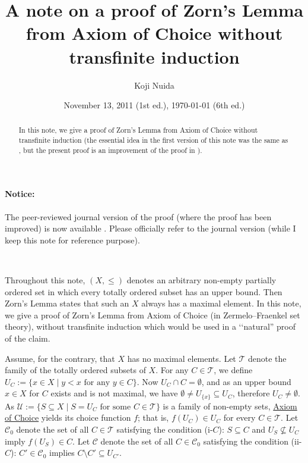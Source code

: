 \documentclass{article}
\title{A note on a proof of Zorn's Lemma from Axiom of Choice without transfinite induction}
\author{Koji Nuida}
\date{November 13, 2011 (1st ed.), \today{} (6th ed.)}
\begin{document}
\maketitle

\begin{abstract}
In this note, we give a proof of Zorn's Lemma from Axiom of Choice without transfinite induction (the essential idea in the first version of this note was the same as \cite[Theorem 4.19]{RubRub85}, but the present proof is an improvement of the proof in \cite{Lewin91}).
\end{abstract}

\paragraph{Notice:}
The peer-reviewed journal version of the proof (where the proof has been improved) is now available \cite{Nuida24}.
Please officially refer to the journal version (while I keep this note for reference purpose).

\ 

Throughout this note, $(X,\leq)$ denotes an arbitrary non-empty partially ordered set in which every totally ordered subset has an upper bound.
Then Zorn's Lemma states that such an $X$ always has a maximal element.
In this note, we give a proof of Zorn's Lemma from Axiom of Choice (in Zermelo--Fraenkel set theory), without transfinite induction which would be used in a \lq\lq natural'' proof of the claim.

Assume, for the contrary, that $X$ has no maximal elements.
Let $\mathcal{T}$ denote the family of the totally ordered subsets of $X$.
For any $C \in \mathcal{T}$, we define $U_C := \{ x \in X \mid y < x \mbox{ for any } y \in C \}$.
Now $U_C \cap C = \emptyset$, and as an upper bound $x \in X$ for $C$ exists and is not maximal, we have $\emptyset \neq U_{\{x\}} \subseteq U_C$, therefore $U_C \neq \emptyset$.
As $\mathcal{U} := \{ S \subseteq X \mid S = U_C \mbox{ for some } C \in \mathcal{T} \}$ is a family of non-empty sets, \underline{Axiom of Choice} yields its choice function $f$; that is, $f(U_C) \in U_C$ for every $C \in \mathcal{T}$.
Let $\mathcal{C}_0$ denote the set of all $C \in \mathcal{T}$ satisfying the condition (i-$C$): $S \subseteq C$ and $U_S \not\subseteq U_C$ imply $f(U_S) \in C$.
Let $\mathcal{C}$ denote the set of all $C \in \mathcal{C}_0$ satisfying the condition (ii-$C$): $C' \in \mathcal{C}_0$ implies $C \setminus C' \subseteq U_{C'}$.
\end{document}
